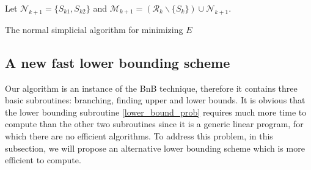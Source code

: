 \documentclass[11pt,bezier,]{article}
\begin{document}
\begin{algorithm}
{%
Let $\mathscr N_{k+1}=\{S_{k1},S_{k2}\}$ and  
$\mathscr M_{k+1}=(\mathscr R_k\backslash \{S_k\})\cup\mathscr N_{k+1}$.
}
\caption{The normal simplicial algorithm  for minimizing $E$ \label{normal_sim_algo}}

\end{algorithm}


\subsection{A new fast lower bounding scheme\label{subsec:fast_bound}}
Our algorithm is an instance of the BnB technique, 
therefore it contains three basic subroutines: branching, finding upper and lower bounds. 
It is obvious that the lower bounding subroutine \eqref{lower_bound_prob} 
requires much more time to compute than the other two subroutines 
since it is a generic linear program, 
for which there are no efficient algorithms. 
To address this problem, in this subsection,
we will propose an alternative lower bounding scheme which is more efficient to compute.
\end{document}

